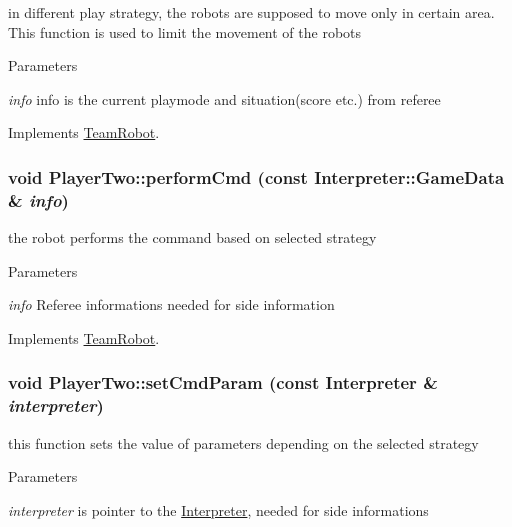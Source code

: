 in different play strategy, the robots are supposed to move only in certain area. This function is used to limit the movement of the robots 


\begin{DoxyParams}{Parameters}
\item[{\em info}]info is the current playmode and situation(score etc.) from referee \end{DoxyParams}


Implements \hyperlink{classTeamRobot_a71ec65db46db1ac511fe17b668d4f192}{TeamRobot}.

\hypertarget{classPlayerTwo_a56d794b718c60092a324f312b8333eb9}{
\subsubsection[{performCmd}]{\setlength{\rightskip}{0pt plus 5cm}void PlayerTwo::performCmd (const {\bf Interpreter::GameData} \& {\em info})}}
\label{classPlayerTwo_a56d794b718c60092a324f312b8333eb9}


the robot performs the command based on selected strategy 


\begin{DoxyParams}{Parameters}
\item[{\em info}]Referee informations needed for side information \end{DoxyParams}


Implements \hyperlink{classTeamRobot_a9b84df51ca16a7203fdb6498ea6741da}{TeamRobot}.

\hypertarget{classPlayerTwo_aa0294cf24297f66ffd92f1a250794340}{
\subsubsection[{setCmdParam}]{\setlength{\rightskip}{0pt plus 5cm}void PlayerTwo::setCmdParam (const {\bf Interpreter} \& {\em interpreter})}}
\label{classPlayerTwo_aa0294cf24297f66ffd92f1a250794340}


this function sets the value of parameters depending on the selected strategy 


\begin{DoxyParams}{Parameters}
\item[{\em interpreter}]is pointer to the \hyperlink{classInterpreter}{Interpreter}, needed for side informations \end{DoxyParams}


